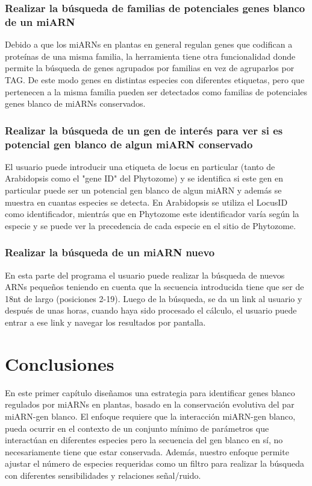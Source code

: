\subsubsection{Realizar la búsqueda de familias de potenciales genes blanco de un miARN}
Debido a que los miARNs en plantas en general regulan genes que codifican a proteínas de una misma familia, la herramienta tiene otra funcionalidad donde permite la búsqueda de genes agrupados por familias en vez de agruparlos por TAG.
De este modo genes en distintas especies con diferentes etiquetas, pero que pertenecen a la misma familia pueden ser detectados como familias de potenciales genes blanco de miARNs conservados.

\subsubsection{Realizar la búsqueda de un gen de interés para ver si es potencial gen blanco de algun miARN conservado}

El usuario puede introducir una etiqueta de locus en particular (tanto de Arabidopsis como el "gene ID" del Phytozome) y se identifica si este gen en particular puede ser un potencial gen blanco de algun miARN y además se muestra en cuantas especies se detecta.
En Arabidopsis se utiliza el LocusID como identificador, mientrás que en Phytozome este identificador varía según la especie y se puede ver la precedencia de cada especie en el sitio de Phytozome.

\subsubsection{Realizar la búsqueda de un miARN nuevo}
En esta parte del programa el usuario puede realizar la búsqueda de nuevos ARNs pequeños teniendo en cuenta que la secuencia introducida tiene que ser de 18nt de largo (posiciones 2-19).
Luego de la búsqueda, se da un link al usuario y después de unas horas, cuando haya sido procesado el cálculo, el usuario puede entrar a ese link y navegar los resultados por pantalla.



\section{Conclusiones}

En este primer capítulo diseñamos una estrategia para identificar genes blanco regulados por miARNs en plantas, basado en la conservación evolutiva del par miARN-gen blanco.
El enfoque requiere que la interacción miARN-gen blanco, pueda ocurrir en el contexto de un conjunto mínimo de parámetros que interactúan en diferentes especies pero la secuencia del gen blanco en sí, no necesariamente tiene que estar conservada.
Además, nuestro enfoque permite ajustar el número de especies requeridas como un filtro para realizar la búsqueda con diferentes sensibilidades y relaciones señal/ruido.

